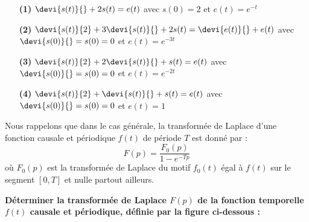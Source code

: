 \begin{itemize}
\item[\textbf{(1)}] $\devi{s(t)}{} + 2s(t) = e(t) $ avec $s(0)=2$ 
                    et $e(t) = e^{-t}$
\item[\textbf{(2)}] $\devi{s(t)}{2} + 3 \devi{s(t)}{} + 2s(t) 
                    = \devi{e(t)}{} + e(t)$ 
                    avec $\devi{s(0)}{}=s(0)=0$ et $e(t) = e^{-3t}$
\item[\textbf{(3)}] $\devi{s(t)}{2} + 2\devi{s(t)}{} + s(t)  = e(t)$ 
                    avec $\devi{s(0)}{}=s(0)=0$ et $e(t) = e^{-2t}$
\item[\textbf{(4)}] $\devi{s(t)}{2} + \devi{s(t)}{} + s(t) = e(t)$ 
                    avec $\devi{s(0)}{}=s(0)=0$ et $e(t) = 1$
\end{itemize}


Nous rappelons que dans le cas générale, 
la transformée de Laplace d'une fonction causale et périodique $f(t)$ de 
période $T$ est donné par :
$$
F(p) = \dfrac{F_0(p)}{1-e^{-Tp}}
$$
où $F_0(p)$ est la transformée de Laplace du motif $f_0(t)$ égal à $f(t)$ 
sur le segment $[0,T]$ et nulle partout ailleurs.

\question{}
\textbf{Déterminer la transformée de Laplace $F(p)$ de la fonction 
        temporelle $f(t)$ causale et périodique, définie par la figure 
        ci-dessous :}

